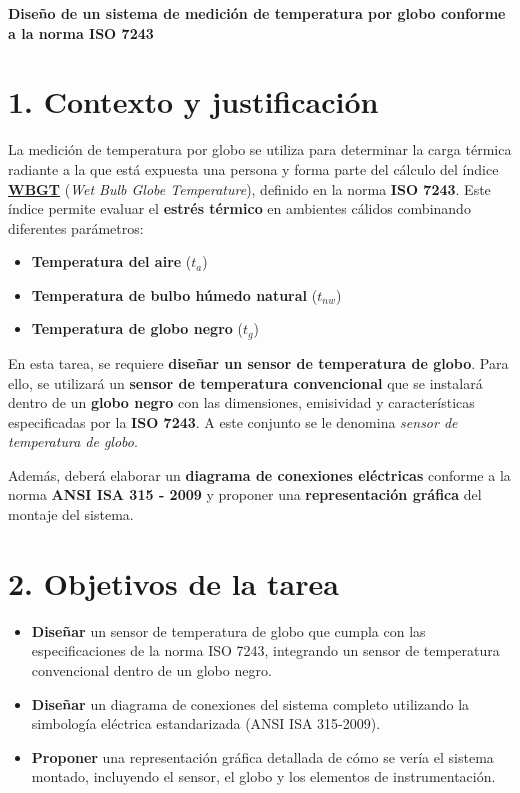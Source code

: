 \documentclass[12pt]{article}
\begin{document}
\setlength{\parindent}{0em}

\textbf{Diseño de un sistema de medición de temperatura por globo conforme a la norma ISO 7243}

\section*{1. Contexto y justificación}
La medición de temperatura por globo se utiliza para determinar la carga térmica radiante a la que está expuesta una persona y forma parte del cálculo del índice \href{https://www.youtube.com/watch?v=EIJeJcLun7Y}{\textbf{WBGT}} (\textit{Wet Bulb Globe Temperature}), definido en la norma \textbf{ISO 7243}. Este índice permite evaluar el \textbf{estrés térmico} en ambientes cálidos combinando diferentes parámetros:

\begin{itemize}
    \item \textbf{Temperatura del aire} ($t_a$)
    \item \textbf{Temperatura de bulbo húmedo natural} ($t_{nw}$)
    \item \textbf{Temperatura de globo negro} ($t_g$)
\end{itemize}

En esta tarea, se requiere \textbf{diseñar un sensor de temperatura de globo}. Para ello, se utilizará un \textbf{sensor de temperatura convencional} que se instalará dentro de un \textbf{globo negro} con las dimensiones, emisividad y características especificadas por la \textbf{ISO 7243}. A este conjunto se le denomina \textit{sensor de temperatura de globo}.  

Además, deberá elaborar un \textbf{diagrama de conexiones eléctricas} conforme a la norma \textbf{ANSI ISA 315 - 2009} y proponer una \textbf{representación gráfica} del montaje del sistema.

\section*{2. Objetivos de la tarea}
\begin{itemize}
    \item \textbf{Diseñar} un sensor de temperatura de globo que cumpla con las especificaciones de la norma ISO 7243, integrando un sensor de temperatura convencional dentro de un globo negro.
    \item \textbf{Diseñar} un diagrama de conexiones del sistema completo utilizando la simbología eléctrica estandarizada (ANSI ISA 315-2009).
    \item \textbf{Proponer} una representación gráfica detallada de cómo se vería el sistema montado, incluyendo el sensor, el globo y los elementos de instrumentación.
\end{itemize}
\end{document}
